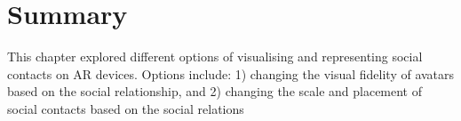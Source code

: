\section{Summary}

This chapter explored different options of visualising and representing social contacts on AR devices. Options include: 1) changing the visual fidelity of avatars based on the social relationship, and 2) changing the scale and placement of social contacts based on the social relations

